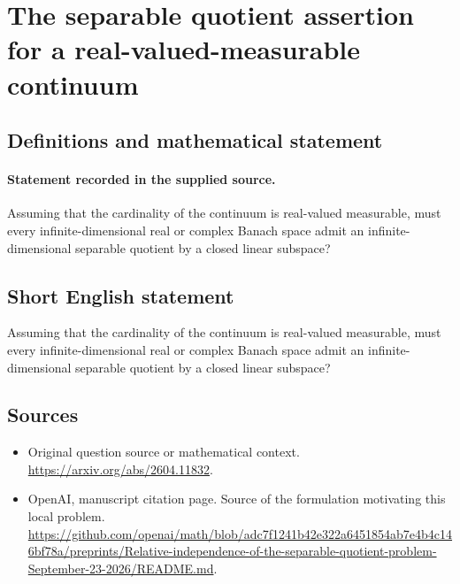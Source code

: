 \documentclass[11pt]{article}
\begin{document}
\section*{The separable quotient assertion for a real-valued-measurable continuum}\label{30007186}
\subsection{Definitions and mathematical statement}
\paragraph{Statement recorded in the supplied source.}
Assuming that the cardinality of the continuum is real-valued measurable, must every infinite-dimensional real or complex Banach space admit an infinite-dimensional separable quotient by a closed linear subspace?
\subsection{Short English statement}
Assuming that the cardinality of the continuum is real-valued measurable, must every infinite-dimensional real or complex Banach space admit an infinite-dimensional separable quotient by a closed linear subspace?
\subsection{Sources}
\begin{itemize}
\item[S1] Original question source or mathematical context.
\url{https://arxiv.org/abs/2604.11832}.
\item[S2] OpenAI, manuscript citation page. Source of the formulation motivating this local problem.
\url{https://github.com/openai/math/blob/adc7f1241b42e322a6451854ab7e4b4c146bf78a/preprints/Relative-independence-of-the-separable-quotient-problem-September-23-2026/README.md}.
\end{itemize}
\end{document}
